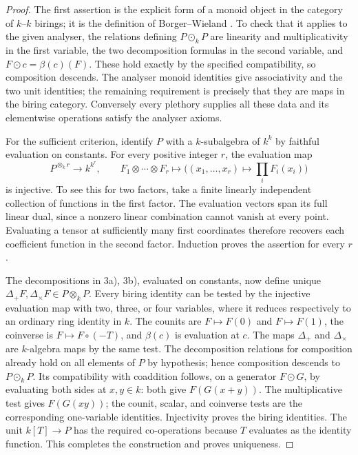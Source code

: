 \begin{proof}
The first assertion is the explicit form of a monoid object in the
category of $k$--$k$ birings; it is the definition of Borger--Wieland
\cite[1.1, 1.3, 1.8]{BorgerWieland2005}. To check that it applies
to the given analyser, the relations defining $P\odot_k P$ are
linearity and multiplicativity in the first variable, the two
decomposition formulas in the second variable, and
$F\odot c=\beta(c)(F)$. These hold exactly by the specified
compatibility, so composition descends. The analyser monoid
identities give associativity and the two unit identities; the
remaining requirement is precisely that they are maps in the
biring category. Conversely every plethory supplies all these
data and its elementwise operations satisfy the analyser axioms.

For the sufficient criterion, identify $P$ with a $k$-subalgebra of
$k^k$ by faithful evaluation on constants. For every positive integer
$r$, the evaluation map
\[
 P^{\otimes_k r}\longrightarrow k^{k^r},\qquad
 F_1\otimes\cdots\otimes F_r\longmapsto
 \bigl((x_1,\ldots,x_r)\mapsto\prod_i F_i(x_i)\bigr)
\]
is injective. To see this for two factors, take a finite linearly
independent collection of functions in the first factor. The
evaluation vectors span its full linear dual, since a nonzero
linear combination cannot vanish at every point. Evaluating a
tensor at sufficiently many first coordinates therefore recovers
each coefficient function in the second factor. Induction proves
the assertion for every $r$.

The decompositions in 3a), 3b), evaluated on constants, now define
unique $\Delta_+F,\Delta_\times F\in P\otimes_k P$. Every biring
identity can be tested by the injective evaluation map with two,
three, or four variables, where it reduces respectively to an
ordinary ring identity in $k$. The counits are $F\mapsto F(0)$
and $F\mapsto F(1)$, the coinverse is $F\mapsto F\circ(-T)$,
and $\beta(c)$ is evaluation at $c$. The maps $\Delta_+$ and
$\Delta_\times$ are $k$-algebra maps by the same test. The
decomposition relations for composition already hold on all
elements of $P$ by hypothesis; hence composition descends to
$P\odot_k P$. Its compatibility with coaddition follows, on a
generator $F\odot G$, by evaluating both sides at $x,y\in k$:
both give $F(G(x+y))$. The multiplicative test gives $F(G(xy))$;
the counit, scalar, and coinverse tests are the corresponding
one-variable identities. Injectivity proves the biring identities.
The unit $k[T]\longrightarrow P$ has the required co-operations
because $T$ evaluates as the identity function. This completes the
construction and proves uniqueness.
\end{proof}

